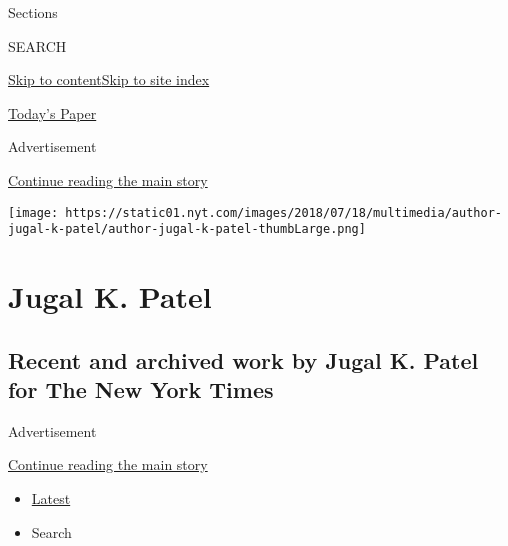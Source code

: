 Sections

SEARCH

\protect\hyperlink{site-content}{Skip to
content}\protect\hyperlink{site-index}{Skip to site index}

\href{https://myaccount.nytimes.com/auth/login?response_type=cookie\&client_id=vi}{}

\href{https://www.nytimes.com/section/todayspaper}{Today's Paper}

Advertisement

\protect\hyperlink{after-top}{Continue reading the main story}

\texttt{[image: https://static01.nyt.com/images/2018/07/18/multimedia/author-jugal-k-patel/author-jugal-k-patel-thumbLarge.png]}

\hypertarget{jugal-k-patel}{%
\section{Jugal K. Patel}\label{jugal-k-patel}}

\hypertarget{recent-and-archived-work-by-jugal-k-patel-for-the-new-york-times}{%
\subsection{Recent and archived work by Jugal K. Patel for The New York
Times}\label{recent-and-archived-work-by-jugal-k-patel-for-the-new-york-times}}

Advertisement

\protect\hyperlink{after-mid1}{Continue reading the main story}

\begin{itemize}
\tightlist
\item
  \protect\hyperlink{stream-panel}{Latest}
\item
  Search
\end{itemize}

